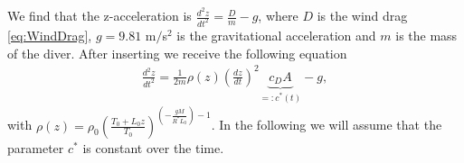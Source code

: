 We find that the z-acceleration is $\frac{d^2z}{dt^2} = \frac{D}{m} - g$, where $D$ is the wind drag \eqref{eq:WindDrag}, $g=9.81$ m$/$s$^2$ is the gravitational acceleration and $m$ is the mass of the diver.
After inserting we receive the following equation
\begin{align}
\frac{d^2z}{dt^2}=\frac{1}{2m}\rho(z)\left(\frac{dz}{dt}\right)^2\underbrace{c_{D}A}_{=:c^*(t)}-g,
\end{align}
with $\rho(z) = \rho _0 \left( \frac{T_0+L_0 z}{T_0}\right) ^{(-\frac{gM}{R^*L_0})-1}$.
In the following we will assume that the parameter $c^*$ is constant over the time.